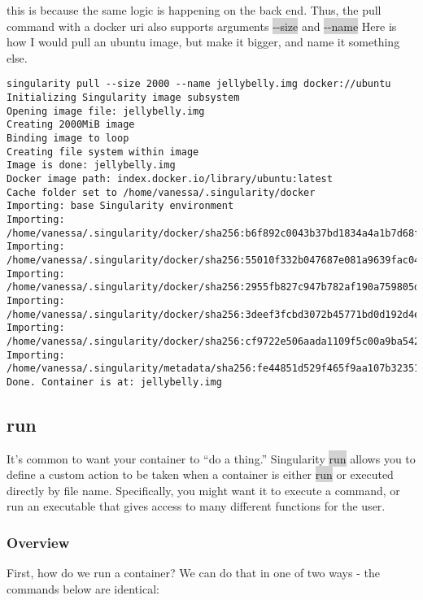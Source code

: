 \documentclass[a4paper]{article}
\begin{document}
this is because the same logic is happening on the back end. Thus, the pull command with a docker uri also supports arguments \colorbox{lightgray}{-{}-size} and \colorbox{lightgray}{-{}-name} Here is how I would pull an ubuntu image, but make it bigger, and name it something else. 

\begin{lstlisting}[frame=single]
singularity pull --size 2000 --name jellybelly.img docker://ubuntu
Initializing Singularity image subsystem
Opening image file: jellybelly.img
Creating 2000MiB image
Binding image to loop
Creating file system within image
Image is done: jellybelly.img
Docker image path: index.docker.io/library/ubuntu:latest
Cache folder set to /home/vanessa/.singularity/docker
Importing: base Singularity environment
Importing: /home/vanessa/.singularity/docker/sha256:b6f892c0043b37bd1834a4a1b7d68fe6421c6acbc7e7e63a4527e1d379f92c1b.tar.gz
Importing: /home/vanessa/.singularity/docker/sha256:55010f332b047687e081a9639fac04918552c144bc2da4edb3422ce8efcc1fb1.tar.gz
Importing: /home/vanessa/.singularity/docker/sha256:2955fb827c947b782af190a759805d229cfebc75978dba2d01b4a59e6a333845.tar.gz
Importing: /home/vanessa/.singularity/docker/sha256:3deef3fcbd3072b45771bd0d192d4e5ff2b7310b99ea92bce062e01097953505.tar.gz
Importing: /home/vanessa/.singularity/docker/sha256:cf9722e506aada1109f5c00a9ba542a81c9e109606c01c81f5991b1f93de7b66.tar.gz
Importing: /home/vanessa/.singularity/metadata/sha256:fe44851d529f465f9aa107b32351c8a0a722fc0619a2a7c22b058084fac068a4.tar.gz
Done. Container is at: jellybelly.img
\end{lstlisting}

\subsection{run}
\label{sec:run}

It’s common to want your container to “do a thing.” Singularity \colorbox{lightgray}{run} allows you to define a custom action to be taken when a container is either \colorbox{lightgray}{run} or executed directly by file name. Specifically, you might want it to execute a command, or run an executable that gives access to many different functions for the user.

\subsubsection{Overview}

First, how do we run a container? We can do that in one of two ways - the commands below are identical:
\end{document}
